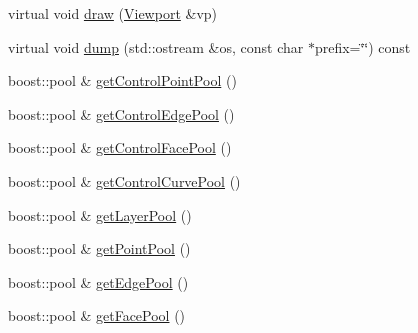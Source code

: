 \begin{DoxyCompactItemize}
\item 
virtual void \hyperlink{classShipCADGeometry_1_1SubdivisionSurface_acfe9cc964dbe05105486b43f2dc6fc4f}{draw} (\hyperlink{classShipCADGeometry_1_1Viewport}{Viewport} \&vp)
\item 
virtual void \hyperlink{classShipCADGeometry_1_1SubdivisionSurface_a6ed961bbb7ca5fe94ec5566109d9b015}{dump} (std\-::ostream \&os, const char $\ast$prefix=\char`\"{}\char`\"{}) const 
\item 
boost\-::pool \& \hyperlink{classShipCADGeometry_1_1SubdivisionSurface_a9d5cdfe8f0fbbb50ab9614d54066d6cc}{get\-Control\-Point\-Pool} ()
\item 
boost\-::pool \& \hyperlink{classShipCADGeometry_1_1SubdivisionSurface_a87533a29f28e1ea0279c6ff48bdcfd85}{get\-Control\-Edge\-Pool} ()
\item 
boost\-::pool \& \hyperlink{classShipCADGeometry_1_1SubdivisionSurface_aa6e26bcb1436e1d1f83141309e3b8dd9}{get\-Control\-Face\-Pool} ()
\item 
boost\-::pool \& \hyperlink{classShipCADGeometry_1_1SubdivisionSurface_af31a65c4b4eb7022212979d7935ceaa6}{get\-Control\-Curve\-Pool} ()
\item 
boost\-::pool \& \hyperlink{classShipCADGeometry_1_1SubdivisionSurface_aa827f5ba825453c633e0f9e4e0153952}{get\-Layer\-Pool} ()
\item 
boost\-::pool \& \hyperlink{classShipCADGeometry_1_1SubdivisionSurface_ad2cdb88cf70335a06ee4a571ce256ee3}{get\-Point\-Pool} ()
\item 
boost\-::pool \& \hyperlink{classShipCADGeometry_1_1SubdivisionSurface_a4f84479805e2570cbfc1906ee812501c}{get\-Edge\-Pool} ()
\item 
boost\-::pool \& \hyperlink{classShipCADGeometry_1_1SubdivisionSurface_a40797b8fb8d4cc57064d2fc3356f4314}{get\-Face\-Pool} ()
\end{DoxyCompactItemize}
